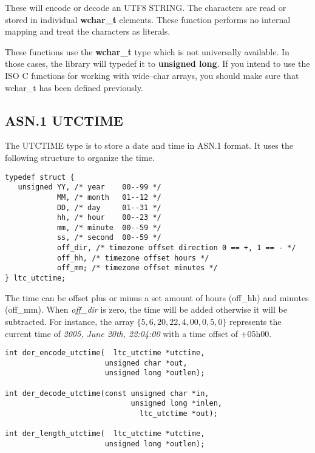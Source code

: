 \documentclass[synpaper]{book}
\begin{document}
These will encode or decode an UTF8 STRING.  The characters are read or stored in individual \textbf{wchar\_t} elements.  These function performs no internal
mapping and treat the characters as literals.

These functions use the \textbf{wchar\_t} type which is not universally available.  In those cases, the library will typedef it to \textbf{unsigned long}.  If you
intend to use the ISO C functions for working with wide--char arrays, you should make sure that wchar\_t has been defined previously.

\subsection{ASN.1 UTCTIME}

The UTCTIME type is to store a date and time in ASN.1 format.  It uses the following structure to organize the time.

\begin{verbatim}
typedef struct {
   unsigned YY, /* year    00--99 */
            MM, /* month   01--12 */
            DD, /* day     01--31 */
            hh, /* hour    00--23 */
            mm, /* minute  00--59 */
            ss, /* second  00--59 */
            off_dir, /* timezone offset direction 0 == +, 1 == - */
            off_hh, /* timezone offset hours */
            off_mm; /* timezone offset minutes */
} ltc_utctime;
\end{verbatim}

The time can be offset plus or minus a set amount of hours (off\_hh) and minutes (off\_mm).  When \textit{off\_dir} is zero, the time will be added otherwise it
will be subtracted.  For instance, the array $\lbrace 5, 6, 20, 22, 4, 00, 0, 5, 0 \rbrace$ represents the current time of
\textit{2005, June 20th, 22:04:00} with a time offset of +05h00.

\begin{verbatim}
int der_encode_utctime(  ltc_utctime *utctime,
                       unsigned char *out,
                       unsigned long *outlen);

int der_decode_utctime(const unsigned char *in,
                             unsigned long *inlen,
                               ltc_utctime *out);

int der_length_utctime(  ltc_utctime *utctime,
                       unsigned long *outlen);
\end{verbatim}
\end{document}
